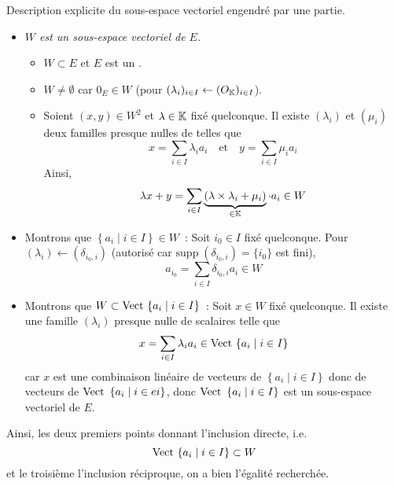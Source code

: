 \documentclass{article}
\renewenvironment{question_kholle}[2][ ]
{
	\subsection{\texorpdfstring{#2}{}}
	\notblank{#1}
	{
		\noindent #1
		\bigbreak
	}
	{}
	\begin{proof}
}
{
	\end{proof}
}
\begin{document}
\begin{question_kholle}{Description explicite du sous-espace vectoriel engendré par une partie.}
	\hfill\\
	\begin{itemize}[label=$\vartriangleright$]
		\item \textit{$W$ est un sous-espace vectoriel de $E$.}
		      \begin{itemize}[label=$\star$]
			      \item $W\subset E$ et $E$ est un \ev.
			      \item $W\neq \emptyset$ car $0_{E}\in W$ (pour $(\lambda_{i})_{i\in I}\leftarrow (O_{\mathbb K})_{i\in I}$).
			      \item Soient $(x,y)\in W^{2}$ et $\lambda\in\mathbb K$ fixé quelconque. Il existe $(\lambda_{i})$ et $(\mu_{i})$ deux familles presque nulles de \K telles que
			            \[
				            x= \sum_{i\in I}\lambda_{i} a_{i} \quad\text{et}\quad y=\sum_{i\in I}\mu_{i} a_{i}
			            \]
			            Ainsi,
			            \[
				            \lambda x+y = \sum_{i\in I}\underbrace{(\lambda \times \lambda_{i} + \mu_{i})}_{\in\mathbb K}\cdot a_{i} \in W
			            \]
		      \end{itemize}
		\item Montrons que $\left\{a_{i} \mid i\in I\right\}\in W$~: Soit $i_{0}\in I$ fixé quelconque. Pour $(\lambda_{i})\leftarrow (\delta_{i_{0}, i})$ (autorisé car $\mathrm{supp}\;(\delta_{i_{0}, i}) = \{i_{0}\}$ est fini),
		      \[
			      a_{i_{0}}=\sum_{i\in I}\delta_{i_{0}, i}a_{i}\in W
		      \]

		\item Montrons que $W\subset \text{Vect }\{a_{i} \mid i\in I\}$~: Soit $x\in W$ fixé quelconque. Il existe une famille $(\lambda_{i})$ presque nulle de scalaires telle que
		      \[
			      x=\sum_{i\in I}\lambda_{i} a_{i} \in \text{Vect } \{a_{i} \mid i\in I\}
		      \]
		      car $x$ est une combinaison linéaire de vecteurs de $\left\{a_{i} \mid i\in I\right\}$ donc de vecteurs de $\text{Vect } \left\{a_{i} \mid i\in ei\right\}$, donc $\text{Vect } \left\{a_{i} \mid i\in I\right\}$ est un sous-espace vectoriel de $E$.
	\end{itemize}
	Ainsi, les deux premiers points donnant l’inclusion directe, i.e.
	\[
		\text{Vect } \{a_{i} \mid i\in I\}\subset W
	\]
	et le troisième l’inclusion réciproque, on a bien l’égalité recherchée.
\end{question_kholle}
\end{document}

